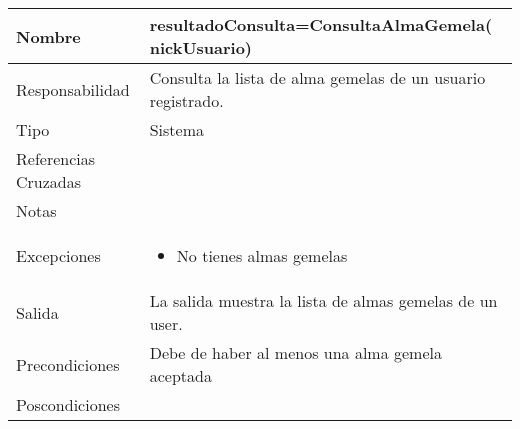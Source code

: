\documentclass{article}
\begin{document}
\begin{table}[h]
\begin{tabular}{|l|l|l|l|l|l|}
\hline
\multicolumn{2}{|p{3cm}|}{Nombre} & \multicolumn{4}{p{10cm}|}{\textbf{resultadoConsulta=ConsultaAlmaGemela( nickUsuario)}}\\
\hline
\multicolumn{2}{|p{3cm}|}{Responsabilidad} & \multicolumn{4}{p{10cm}|}{Consulta la lista de alma gemelas de un usuario registrado.} \\
\hline
\multicolumn{2}{|p{3cm}|}{Tipo} & \multicolumn{4}{p{10cm}|}{Sistema} \\
\hline
\multicolumn{2}{|p{3cm}|}{Referencias Cruzadas} & \multicolumn{4}{p{10cm}|}{} \\
\hline
\multicolumn{2}{|p{3cm}|}{Notas} & \multicolumn{4}{p{10cm}|}{} \\
\hline
\multicolumn{2}{|p{3cm}|}{Excepciones} & \multicolumn{4}{p{10cm}|}{\begin{itemize}
\item No tienes almas gemelas
\end{itemize}} \\
\hline
\multicolumn{2}{|p{3cm}|}{Salida} & \multicolumn{4}{p{10cm}|}{La salida muestra la lista de almas gemelas de un user.} \\
\hline
\multicolumn{2}{|p{3cm}|}{Precondiciones} & \multicolumn{4}{p{10cm}|}{Debe de haber al menos una alma gemela aceptada} \\
\hline
\multicolumn{2}{|p{3cm}|}{Poscondiciones} & \multicolumn{4}{p{10cm}|}{} \\
\hline
\end{tabular}
\end{table}
\end{document}
